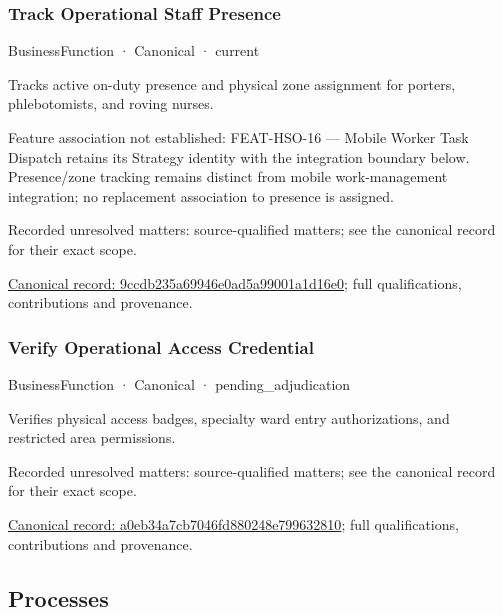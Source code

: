 \subsubsection{Track Operational Staff Presence}

\label{element:9ccdb235a69946e0ad5a99001a1d16e0}
{\small BusinessFunction · Canonical · current}\par

Tracks active on-duty presence and physical zone assignment for porters, phlebotomists, and roving nurses.



Feature association not established: FEAT-HSO-16 — Mobile Worker Task Dispatch retains its Strategy identity with the integration boundary below. Presence/zone tracking remains distinct from mobile work-management integration; no replacement association to presence is assigned.


{\small Recorded unresolved matters: source-qualified matters; see the canonical record for their exact scope.}\par
{\footnotesize \href{../../../../continuum/business/business-function/9ccdb235a69946e0ad5a99001a1d16e0.md}{Canonical record: 9ccdb235a69946e0ad5a99001a1d16e0}; full qualifications, contributions and provenance.}\par
\subsubsection{Verify Operational Access Credential}

\label{element:a0eb34a7cb7046fd880248e799632810}
{\small BusinessFunction · Canonical · pending\_adjudication}\par

Verifies physical access badges, specialty ward entry authorizations, and restricted area permissions.


{\small Recorded unresolved matters: source-qualified matters; see the canonical record for their exact scope.}\par
{\footnotesize \href{../../../../continuum/business/business-function/a0eb34a7cb7046fd880248e799632810.md}{Canonical record: a0eb34a7cb7046fd880248e799632810}; full qualifications, contributions and provenance.}\par
\subsection{Processes}

